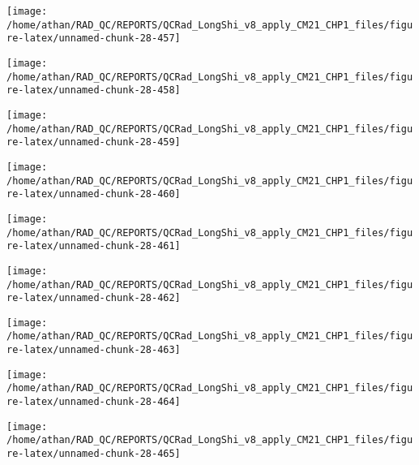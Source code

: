 \documentclass[
  10pt,
  a4paper,oneside]{article}
\begin{document}
\begin{center}\texttt{[image: /home/athan/RAD\_QC/REPORTS/QCRad\_LongShi\_v8\_apply\_CM21\_CHP1\_files/figure-latex/unnamed-chunk-28-457]} \end{center}

\begin{center}\texttt{[image: /home/athan/RAD\_QC/REPORTS/QCRad\_LongShi\_v8\_apply\_CM21\_CHP1\_files/figure-latex/unnamed-chunk-28-458]} \end{center}

\begin{center}\texttt{[image: /home/athan/RAD\_QC/REPORTS/QCRad\_LongShi\_v8\_apply\_CM21\_CHP1\_files/figure-latex/unnamed-chunk-28-459]} \end{center}

\begin{center}\texttt{[image: /home/athan/RAD\_QC/REPORTS/QCRad\_LongShi\_v8\_apply\_CM21\_CHP1\_files/figure-latex/unnamed-chunk-28-460]} \end{center}

\begin{center}\texttt{[image: /home/athan/RAD\_QC/REPORTS/QCRad\_LongShi\_v8\_apply\_CM21\_CHP1\_files/figure-latex/unnamed-chunk-28-461]} \end{center}

\begin{center}\texttt{[image: /home/athan/RAD\_QC/REPORTS/QCRad\_LongShi\_v8\_apply\_CM21\_CHP1\_files/figure-latex/unnamed-chunk-28-462]} \end{center}

\begin{center}\texttt{[image: /home/athan/RAD\_QC/REPORTS/QCRad\_LongShi\_v8\_apply\_CM21\_CHP1\_files/figure-latex/unnamed-chunk-28-463]} \end{center}

\begin{center}\texttt{[image: /home/athan/RAD\_QC/REPORTS/QCRad\_LongShi\_v8\_apply\_CM21\_CHP1\_files/figure-latex/unnamed-chunk-28-464]} \end{center}

\begin{center}\texttt{[image: /home/athan/RAD\_QC/REPORTS/QCRad\_LongShi\_v8\_apply\_CM21\_CHP1\_files/figure-latex/unnamed-chunk-28-465]} \end{center}
\end{document}
